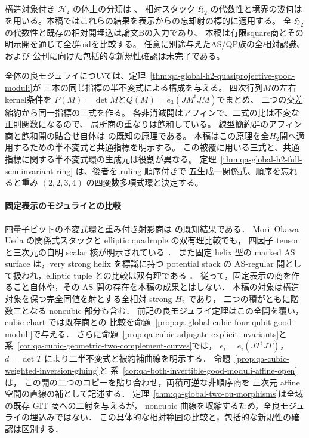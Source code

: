 \documentclass[a4paper,11pt]{ltjsarticle}
\numberwithin{equation}{section}
\theoremstyle{plain}
\theoremstyle{definition}
\theoremstyle{remark}
\newcommand{\HH}{\mathcal H_2}
\newcommand{\HHstack}{\mathfrak H_2}
\begin{document}
構造対象付き $\HH$ の体上の分類は \cite{QuadricIntrinsic2026}、
相対スタック $\HHstack$ の代数性と境界の幾何は \cite{QuadricModuli2026}
を用いる。本稿ではこれらの結果を表示からの忘却射の標的に適用する。
全 $\HHstack$ の代数性と既存の相対開埋込は論文Bの入力であり、
本稿は有限square商とその明示開を通じて全群oidを比較する。
任意に別途与えたAS/QP族の全相対認識、および
公刊に向けた包括的な新規性確認は未完了である。

全体の良モジュライについては、定理~\ref{thm:qa-global-h2-quasiprojective-good-moduli}が
三本の同じ指標の半不変式による構成を与える。
四次行列$M$の左右kernel条件を
$P(M)=\det M$と$Q(M)=e_3(JM^{\mathrm{t}}JM)$でまとめ、
二つの交差縮約から同一指標の三式を作る。
各非消滅開はアフィンで、二式の比は不変な正則関数になるので、
局所商の重なりは飽和している。
線型簡約群のアフィン商と飽和開の貼合せ自体は
\cite[Proposition 7.9, Theorems 13.2 and 13.6]{AlperGoodModuli2013}の既知の原理である。
本稿はこの原理を全$H_2$開へ適用するための半不変式と共通指標を明示する。
この被覆に用いる三式と、共通指標に関する半不変式環の生成元は役割が異なる。
定理~\ref{thm:qa-global-h2-full-semiinvariant-ring} は、後者を ruling 順序付きで
五生成一関係式、順序を忘れると重み $(2,2,3,4)$ の四変数多項式環と決定する。

\paragraph{固定表示のモジュライとの比較}
四量子ビットの不変式環と重み付き射影商は
\cite[\S3, (3.9)--(3.16)]{OU2014}の既知結果である．
Mori--Okawa--Ueda の関係式スタックと elliptic quadruple の双有理比較でも，
四因子 tensor と三次元の自明 scalar 核が明示されている
\cite[Theorem 1.1, \S5.3, (5.24)--(5.26)]{MOU2019}．
また固定 helix 型の marked AS surface は，very strong helix を標識に持つ
potential stack の AS-regular 開として扱われ，elliptic tuple との比較は双有理である
\cite[Definition 1.1, Theorem 6.4]{OU2025MarkedAS}．
従って，固定表示の商を作ること自体や，その AS 開の存在を本稿の成果とはしない．
本稿の対象は構造対象を保つ完全同値を射とする全相対 strong $H_2$ であり，
二つの積がともに階数三となる noncubic 部分も含む．
前記の良モジュライ定理はこの全開を覆い，cubic chart では既存商との
比較を命題~\ref{prop:qa-global-cubic-four-qubit-good-moduli}で与える．
さらに命題~\ref{prop:qa-cubic-adjugate-explicit-invariants}と
系~\ref{cor:qa-cubic-geometric-two-complement-curves}では，
$e_i=e_i(JT^{\mathrm{t}}JT)$，$d=\det T$ により二半不変式と被約補曲線を明示する．
命題~\ref{prop:qa-cubic-weighted-inversion-gluing}と
系~\ref{cor:qa-both-invertible-good-moduli-affine-open}は，
この開の二つのコピーを貼り合わせ，両積可逆な非順序商を
三次元 affine 空間の直線の補として記述する．
定理~\ref{thm:qa-global-two-ou-morphisms}は全域の既存 GIT 商への二射を与えるが，
noncubic 曲線を収縮するため，全良モジュライの埋込みではない．
この具体的な相対範囲の比較と，包括的な新規性の確認は区別する．
\end{document}
